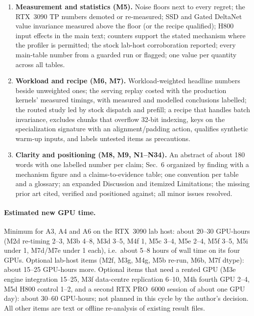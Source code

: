 \documentclass[11pt]{article}
\begin{document}
\begin{enumerate}[label=A\arabic*.]
        six reported, latency-weighted regret, maxima, per-batch values and
        intervals; the abstract and conclusion state the protocol-dependent
        accuracy with its latency-weighted companion; the form-blind
        comparison with the three-parameter restriction and the MLPs is stated
        plainly; the fit is documented; the latency term is justified or
        refitted; the model is positioned as a cross-device or pruning case
        study.
  \item \textbf{Measurement and statistics (M5).} Noise floors next to every
        regret; the RTX~3090 TP numbers demoted or re-measured; SSD and Gated
        DeltaNet value invariance measured above the floor (or the recipe
        qualified); H800 input effects in the main text; counters support the
        stated mechanism where the profiler is permitted; the stock lab-host
        corroboration reported; every main-table number from a guarded run or
        flagged; one value per quantity across all tables.
  \item \textbf{Workload and recipe (M6, M7).} Workload-weighted headline
        numbers beside unweighted ones; the serving replay costed with the
        production kernels' measured timings, with measured and modelled
        conclusions labelled; the routed study led by stock dispatch and
        prefill; a recipe that handles batch invariance, excludes chunks that
        overflow 32-bit indexing, keys on the specialization signature with an
        alignment/padding action, qualifies synthetic warm-up inputs, and
        labels untested items as precautions.
  \item \textbf{Clarity and positioning (M8, M9, N1--N34).} An abstract of
        about 180 words with one labelled number per claim; Sec.~6 organized
        by finding with a mechanism figure and a claims-to-evidence table; one
        convention per table and a glossary; an expanded Discussion and
        itemized Limitations; the missing prior art cited, verified and
        positioned against; all minor issues resolved.
\end{enumerate}

\paragraph{Estimated new GPU time.} Minimum for A3, A4 and A6 on the RTX~3090
lab host: about 20--30 GPU-hours (M2d re-timing 2--3, M3b 4--8, M3d 3--5, M4f
1, M5c 3--4, M5e 2--4, M5f 3--5, M5i under 1, M7d/M7e under 1 each), i.e.\
about 5--8 hours of wall time on its four GPUs. Optional lab-host items (M2f,
M3g, M4g, M5b re-run, M6b, M7f dtype): about 15--25 GPU-hours more. Optional
items that need a rented GPU (M3e engine integration 15--25, M3f data-centre
replication 6--10, M4h fourth GPU 2--4, M5d H800 control 1--2, and a second RTX
PRO~6000 session of about one GPU day): about 30--60 GPU-hours; not planned in
this cycle by the author's decision. All other items are text or offline
re-analysis of existing result files.
\end{document}

